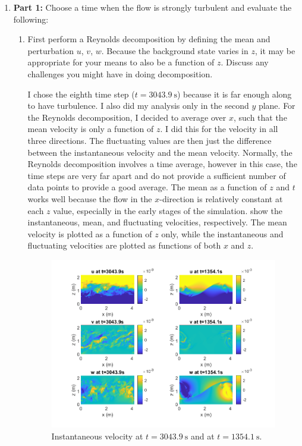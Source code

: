 \documentclass[11pt]{article}
\begin{document}
	
	\begin{enumerate}
		\item \textbf{Part 1:} Choose a time when the flow is strongly turbulent and evaluate the following:
		\begin{enumerate}
			\item First perform a Reynolds decomposition by defining the mean and perturbation $u$, $v$, $w$. Because the background state varies in $z$, it may be appropriate for your means to also be a function of $z$. Discuss any challenges you might have in doing decomposition.\par
			
			I chose the eighth time step ($t=\SI{3043.9}{\second}$) because it is far enough along to have turbulence. I also did my analysis only in the second $y$ plane. For the Reynolds decomposition, I decided to average over $x$, such that the mean velocity is only a function of $z$. I did this for the velocity in all three directions. The fluctuating values are then just the difference between the instantaneous velocity and the mean velocity. Normally, the Reynolds decomposition involves a time average, however in this case, the time steps are very far apart and do not provide a sufficient number of data points to provide a good average. The mean as a function of $z$ and $t$ works well because the flow in the $x$-direction is relatively constant at each $z$ value, especially in the early stages of the simulation.  show the instantaneous, mean, and fluctuating velocities, respectively. The mean velocity is plotted as a function of $z$ only, while the instantaneous and fluctuating velocities are plotted as functions of both $x$ and $z$. 
			
			
			\begin{figure}[htbp]
				\centering
				\includegraphics[width=\textwidth]{1-plots/Vel_plot_3043_1354.png}
				\caption{Instantaneous velocity at $t=\SI{3043.9}{\second}$ and at $t=\SI{1354.1}{\second}$.}
				\label{fig:Vel}
			\end{figure}
		

\end{enumerate}
\end{enumerate}
\end{document}
